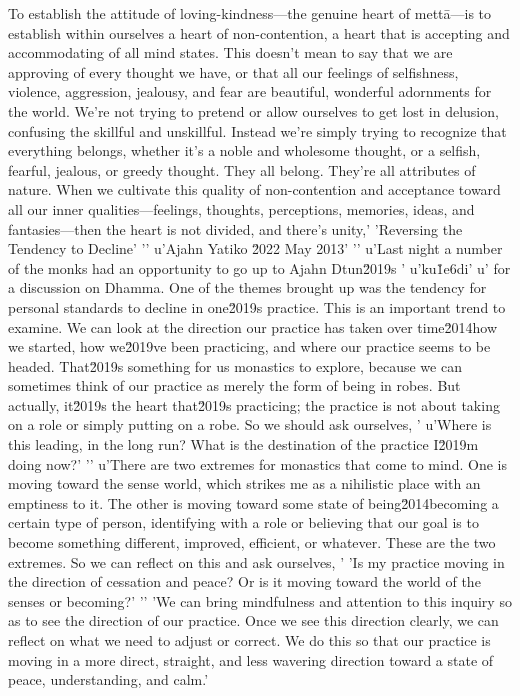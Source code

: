 To establish the attitude of loving-kindness---the genuine heart of 
mettā---is to establish within ourselves a heart of non-contention, a 
heart that is accepting and accommodating of all mind states. This 
doesn't mean to say that we are approving of every thought we have, or 
that all our feelings of selfishness, violence, aggression, jealousy, 
and fear are beautiful, wonderful adornments for the world. We're not 
trying to pretend or allow ourselves to get lost in delusion, confusing 
the skillful and unskillful. Instead we're simply trying to recognize 
that everything belongs, whether it's a noble and wholesome thought, or 
a selfish, fearful, jealous, or greedy thought. They all belong. 
They're all attributes of nature. When we cultivate this quality of 
non-contention and acceptance toward all our inner 
qualities---feelings, thoughts, perceptions, memories, ideas, and 
fantasies---then the heart is not divided, and there's unity,\n'
'Reversing the Tendency to Decline'
'\n'
u'Ajahn Yatiko \u2022 May 2013'
'\n'
u'Last night a number of the monks had an opportunity to go up to Ajahn Dtun\u2019s '
u'ku\u1e6di'
u' for a discussion on Dhamma. One of the themes brought up was the tendency for personal standards to decline in one\u2019s practice. This is an important trend to examine. We can look at the direction our practice has taken over time\u2014how we started, how we\u2019ve been practicing, and where our practice seems to be headed. That\u2019s something for us monastics to explore, because we can sometimes think of our practice as merely the form of being in robes. But actually, it\u2019s the heart that\u2019s practicing; the practice is not about taking on a role or simply putting on a robe. So we should ask ourselves, '
u'Where is this leading, in the long run? What is the destination of the practice I\u2019m doing now?'
'\n'
u'There are two extremes for monastics that come to mind. One is moving toward the sense world, which strikes me as a nihilistic place with an emptiness to it. The other is moving toward some state of being\u2014becoming a certain type of person, identifying with a role or believing that our goal is to become something different, improved, efficient, or whatever. These are the two extremes. So we can reflect on this and ask ourselves, '
'Is my practice moving in the direction of cessation and peace? Or is it moving toward the world of the senses or becoming?'
'\n'
'We can bring mindfulness and attention to this inquiry so as to see the direction of our practice. Once we see this direction clearly, we can reflect on what we need to adjust or correct. We do this so that our practice is moving in a more direct, straight, and less wavering direction toward a state of peace, understanding, and calm.'
